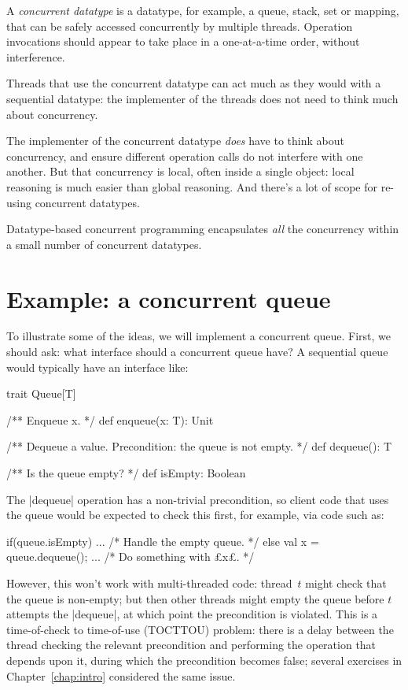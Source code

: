 A \emph{concurrent datatype} is a datatype, for example, a queue, stack, set
or mapping, that can be safely accessed concurrently by multiple threads.
Operation invocations should appear to take place in a one-at-a-time order,
without interference.

Threads that use the concurrent datatype can act much as they would with a
sequential datatype: the implementer of the threads does not need to think
much about concurrency.  

The implementer of the concurrent datatype \emph{does} have to think about
concurrency, and ensure different operation calls do not interfere with one
another.  But that concurrency is local, often inside a single object: local
reasoning is much easier than global reasoning.  And there's a lot of scope
for re-using concurrent datatypes.

Datatype-based concurrent programming encapsulates \emph{all} the concurrency
within a small number of concurrent datatypes.


\section{Example: a concurrent queue}

To illustrate some of the ideas, we will implement a concurrent queue.  First,
we should ask: what interface should a concurrent queue have?  A sequential
queue would typically have an interface like:
%
\begin{mysamepage}
\begin{scala}
trait Queue[T]{
  /** Enqueue x. */
  def enqueue(x: T): Unit

  /** Dequeue a value.  Precondition: the queue is not empty. */
  def dequeue(): T

  /** Is the queue empty? */
  def isEmpty: Boolean
}
\end{scala}
\end{mysamepage}
%
The |dequeue| operation has a non-trivial precondition, so client code that
uses the queue would be expected to check this first, for example, via code
such as:
\begin{scala}
  if(queue.isEmpty){ ... /* Handle the empty queue. */ } 
  else{ val x = queue.dequeue(); ... /* Do something with £x£. */ }
\end{scala}

However, this won't work with multi-threaded code: thread~$t$ might check that
the queue is non-empty; but then other threads might empty the queue before
$t$ attempts the |dequeue|, at which point the precondition is violated.  This
is a time-of-check to time-of-use (TOCTTOU) problem: there is a delay between
the thread checking the relevant precondition and performing the operation that
depends upon it, during  which the precondition becomes false; several
exercises in Chapter~\ref{chap:intro} considered the same issue.


